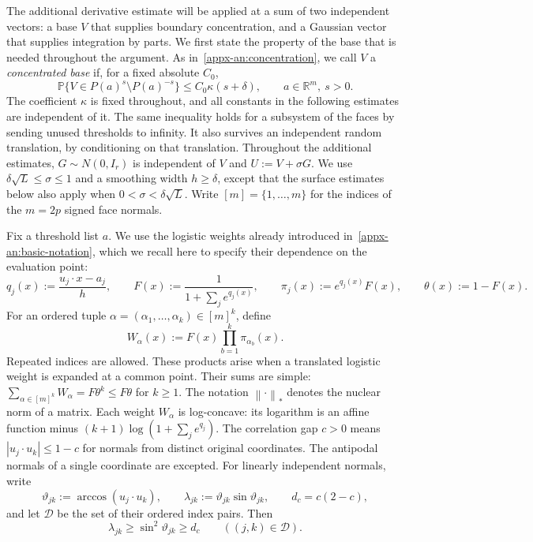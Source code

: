 \documentclass[11pt,letterpaper]{article}
\theoremstyle{remark}
\newcommand{\Pp}{\mathbb P}
\newcommand{\R}{\mathbb R}
\newcommand{\cD}{\mathcal D}
\newcommand{\norm}[1]{\left\lVert#1\right\rVert}
\begin{document}
The additional derivative estimate will be applied at a sum of two
independent vectors: a base $V$ that supplies boundary concentration,
and a Gaussian vector that supplies integration by parts. We first
state the property of the base that is needed throughout the argument.
As in~\eqref{appx-an:concentration}, we call $V$ a
\emph{concentrated base} if, for a fixed absolute $C_0$,
\begin{equation}\label{hgap:eq:ac}
 \Pp\{V\in P(a)^s\setminus P(a)^{-s}\}
       \le C_0\kappa(s+\delta),
       \qquad a\in\R^m,\ s>0.
\end{equation}
The coefficient $\kappa$ is fixed throughout, and all constants in
the following estimates are independent of it. The same inequality holds
for a subsystem of the faces by sending
unused thresholds to infinity. It also survives an independent random
translation, by conditioning on that translation. Throughout the
additional estimates, $G\sim N(0,I_r)$ is independent of $V$ and
$U:=V+\sigma G$. We use
\(\delta\sqrt L\le\sigma\le1\) and a smoothing width \(h\ge\delta\),
except that the surface estimates below also apply when
\(0<\sigma<\delta\sqrt L\). Write \([m]=\{1,\ldots,m\}\) for the
indices of the \(m=2p\) signed face normals.

Fix a threshold list $a$. We use the logistic weights already introduced
in~\eqref{appx-an:basic-notation}, which we recall here to specify their
dependence on the evaluation point:
\[
 q_j(x):=\frac{u_j\cdot x-a_j}{h},\qquad
 F(x):=\frac1{1+\sum_j e^{q_j(x)}},\qquad
 \pi_j(x):=e^{q_j(x)}F(x),\qquad \theta(x):=1-F(x).
\]
For an ordered tuple $\alpha=(\alpha_1,\ldots,\alpha_k)\in[m]^k$, define
\[
 W_\alpha(x):=F(x)\prod_{b=1}^k\pi_{\alpha_b}(x).
\]
Repeated indices are allowed. These products arise when a translated
logistic weight is expanded at a common point. Their sums are simple:
$\sum_{\alpha\in[m]^k}W_\alpha=F\theta^k\le F\theta$ for $k\ge1$.
The notation $\norm{\cdot}_*$ denotes the nuclear norm of a matrix.
Each weight $W_\alpha$ is log-concave: its logarithm is an affine
function minus $(k+1)\log(1+\sum_j e^{q_j})$.
The correlation gap $c>0$ means
$|u_j\cdot u_k|\le1-c$ for normals from distinct original coordinates.
The antipodal normals of a single coordinate are excepted. For
linearly independent normals, write
\[
 \vartheta_{jk}:=\arccos(u_j\cdot u_k),\qquad
 \lambda_{jk}:=\vartheta_{jk}\sin\vartheta_{jk},\qquad
 d_c=c(2-c),
\]
and let $\cD$ be the set of their ordered index pairs. Then
\begin{equation}
 \lambda_{jk}\ge\sin^2\vartheta_{jk}\ge d_c
 \qquad((j,k)\in\cD).
 \label{hgap:eq:gap}
\end{equation}
\end{document}
